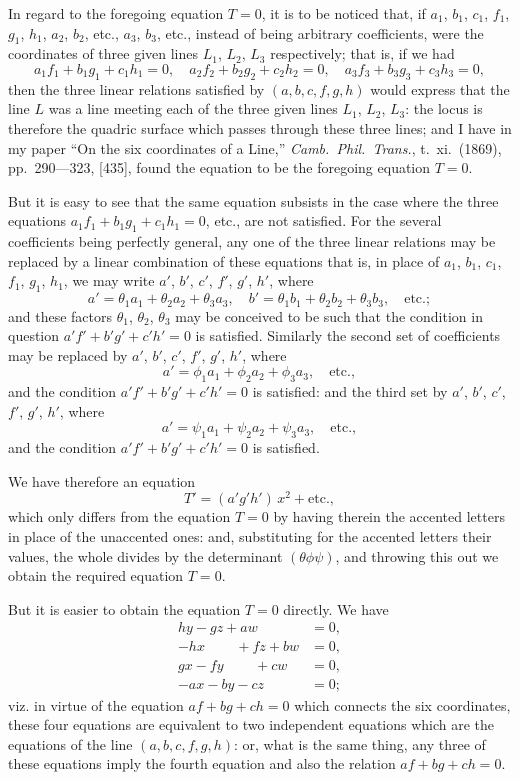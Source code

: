 \documentclass[11pt,a4paper]{book}
\begin{document}
In regard to the foregoing equation $T = 0$, it is to be noticed that, if $a_1$, $b_1$, $c_1$, $f_1$, $g_1$, $h_1$, $a_2$, $b_2$, etc., $a_3$, $b_3$, etc., instead of being arbitrary coefficients, were the coordinates of three given lines $L_1$, $L_2$, $L_3$ respectively; that is, if we had
\[
a_1 f_1 + b_1 g_1 + c_1 h_1 = 0, \quad a_2 f_2 + b_2 g_2 + c_2 h_2 = 0, \quad a_3 f_3 + b_3 g_3 + c_3 h_3 = 0,
\]
then the three linear relations satisfied by $(a, b, c, f, g, h)$ would express that the line $L$ was a line meeting each of the three given lines $L_1$, $L_2$, $L_3$: the locus is therefore the quadric surface which passes through these three lines; and I have in my paper ``On the six coordinates of a Line,'' \textit{Camb.\ Phil.\ Trans.}, t.\ xi.\ (1869), pp.\ 290---323, [435], found the equation to be the foregoing equation $T=0$.

But it is easy to see that the same equation subsists in the case where the three equations $a_1 f_1 + b_1 g_1 + c_1 h_1 = 0$, etc., are not satisfied. For the several coefficients being perfectly general, any one of the three linear relations may be replaced by a linear combination of these equations that is, in place of $a_1$, $b_1$, $c_1$, $f_1$, $g_1$, $h_1$, we may write $a'$, $b'$, $c'$, $f'$, $g'$, $h'$, where
\[
a' = \theta_1 a_1 + \theta_2 a_2 + \theta_3 a_3, \quad b' = \theta_1 b_1 + \theta_2 b_2 + \theta_3 b_3, \quad \text{etc.};
\]
and these factors $\theta_1$, $\theta_2$, $\theta_3$ may be conceived to be such that the condition in question $a' f' + b' g' + c' h' = 0$ is satisfied. Similarly the second set of coefficients may be replaced by $a'$, $b'$, $c'$, $f'$, $g'$, $h'$, where
\[
a' = \phi_1 a_1 + \phi_2 a_2 + \phi_3 a_3, \quad \text{etc.},
\]
and the condition $a' f' + b' g' + c' h' = 0$ is satisfied: and the third set by $a'$, $b'$, $c'$, $f'$, $g'$, $h'$, where
\[
a' = \psi_1 a_1 + \psi_2 a_2 + \psi_3 a_3, \quad \text{etc.},
\]
and the condition $a' f' + b' g' + c' h' = 0$ is satisfied.

We have therefore an equation
\[
T' = (a'g'h')\, x^2 + \text{etc.},
\]
which only differs from the equation $T=0$ by having therein the accented letters in place of the unaccented ones: and, substituting for the accented letters their values, the whole divides by the determinant $(\theta\phi\psi)$, and throwing this out we obtain the required equation $T = 0$.

But it is easier to obtain the equation $T=0$ directly. We have
\begin{align*}
hy - gz + aw &= 0, \\
-hx \phantom{{}-gz} + fz + bw &= 0, \\
gx - fy \phantom{{}+fz} + cw &= 0, \\
-ax - by - cz \phantom{{}+cw} &= 0;
\end{align*}
viz. in virtue of the equation $af + bg + ch = 0$ which connects the six coordinates, these four equations are equivalent to two independent equations which are the equations of the line $(a, b, c, f, g, h)$: or, what is the same thing, any three of these equations imply the fourth equation and also the relation $af + bg + ch = 0$.
\end{document}
